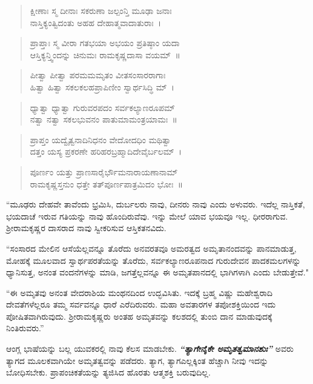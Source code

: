 \newpage

\begin{verse}
 ಕ್ಷೀಣಾಃ ಸ್ಮ ದೀನಾಃ ಸಕರುಣಾ ಜಲ್ಪಂನ್ತಿ ಮೂಢಾ ಜನಾಃ\\
 ನಾಸ್ತಿಕ್ಯಂತ್ವಿದಂತು ಅಹಹ ದೇಹಾತ್ಮವಾದಾತುರಾಃ~। 
\end{verse}

\begin{verse}
 ಪ್ರಾಪ್ತಾಃ ಸ್ಮ ವೀರಾ ಗತಭಯಾ ಅಭಯಂ ಪ್ರತಿಷ್ಠಾಂ ಯದಾ\\
 ಆಸ್ತಿಕ್ಯನ್ತ್ವಿಂದನ್ನು ಚಿನುಮಃ ರಾಮಕೃಷ್ಣದಾಸಾ ವಯಮ್~॥ 
\end{verse}

\begin{verse}
 ಪೀತ್ವಾ ಪೀತ್ವಾ ಪರಮಮಮೃತಂ ವೀತಸಂಸಾರರಾಗಾಃ\\
 ಹಿತ್ವಾ ಹಿತ್ವಾ ಸಕಲಕಲಹಪ್ರಾಪಿಣೀಂ ಸ್ವಾರ್ಥಸಿದ್ಧಿ ಮ್~। 
\end{verse}

\begin{verse}
 ಧ್ಯಾತ್ವಾ ಧ್ಯಾತ್ವಾ ಗುರುವರಪದಂ ಸರ್ವಕಲ್ಯಾಣರೂಪಮ್\\
 ನತ್ವಾ ನತ್ವಾ ಸಕಲಭುವನಂ ಪಾತುಮಾಮಂತ್ರಯಾಮಃ~॥ 
\end{verse}

\begin{verse}
 ಪ್ರಾಪ್ತಂ ಯದ್ವೈತ್ವನಾದಿನಿಧನಂ ವೇದೋದಧಿಂ ಮಥಿತ್ವಾ\\
 ದತ್ತಂ ಯಸ್ಯ ಪ್ರಕರಣೇ ಹರಿಹರಬ್ರಹ್ಮಾದಿದೇವೈರ್ಬಲಮ್~। 
\end{verse}

\begin{verse}
 ಪೂರ್ಣಂ ಯತ್ತು ಪ್ರಾಣಸಾರೈರ್ಭೌಮನಾರಾಯಣಾನಾಮ್\\
 ರಾಮಕೃಷ್ಣಸ್ತನುಂ ಧತ್ತೇ ತತ್‌ಪೂರ್ಣಪಾತ್ರಮಿದಂ ಭೋಃ~॥ 
\end{verse}

“ಮೂಢರು ದೇಹವೇ ತಾವೆಂದು ಭ್ರಮಿಸಿ, ದುರ್ಬಲರು ನಾವು, ದೀನರು ನಾವು ಎಂದು ಅಳುವರು. ಇದೆಲ್ಲ ನಾಸ್ತಿಕತೆ, ಭಯದಾಚೆ ಇರುವ ಗತಿಯನ್ನು ನಾವು ಹೊಂದಿರುವೆವು. ಇನ್ನು ಮೇಲೆ ಯಾವ ಭಯವೂ ಇಲ್ಲ. ಧೀರರಾಗುವ. ಶ‍್ರೀರಾಮಕೃಷ್ಣರ ದಾಸರಾದ ನಾವು ಸ್ವೀಕರಿಸುವ ಆಸ್ತಿಕತನವಿದು.

``ಸಂಸಾರದ ಮೇಲಿನ ಆಸೆಯೆಲ್ಲವನ್ನೂ ತೊರೆದು ಅನವರತವೂ ಅಮರತ್ವದ ಅಮೃತಾನಂದವನ್ನು ಪಾನಮಾಡುತ್ತ, ಮೋಹಕ್ಕೆ ಮೂಲವಾದ ಸ್ವಾರ್ಥಪರತೆಯನ್ನು ತೊರೆದು, ಸರ್ವಕಲ್ಯಾಣರೂಪನಾದ ಗುರುದೇವನ ಪಾದಕಮಲಗಳನ್ನು ಧ್ಯಾನಿಸುತ್ತ, ಅನಂತ ವಂದನೆಗಳನ್ನು ಮಾಡಿ, ಜಗತ್ತೆಲ್ಲವನ್ನೂ ಈ ಅಮೃತಪಾನದಲ್ಲಿ ಭಾಗಿಗಳಾಗಿ ಎಂದು ಬೇಡುತ್ತೇವೆ."

“ಈ ಅಮೃತವು ಅನಂತ ವೇದರಾಶಿಯ ಮಂಥನದಿಂದ ಉದ್ಭವಿಸಿತು. ಇದಕ್ಕೆ ಬ್ರಹ್ಮ ವಿಷ್ಣು ಮಹೇಶ್ವರಾದಿ ದೇವತೆಗಳೆಲ್ಲರೂ ತಮ್ಮ ಸರ್ವವನ್ನೂ ಧಾರೆ ಎರೆದಿರುವರು. ಮಹಾ ಅವತಾರಗಳ ತಪೋಶಕ್ತಿಯಿಂದ ಇದು ಪೋಷಿತವಾಗಿರುವುದು. ಶ‍್ರೀರಾಮಕೃಷ್ಣರು ಅಂತಹ ಅಮೃತವನ್ನು ಕಲಶದಲ್ಲಿ ತುಂಬಿ ದಾನ ಮಾಡುವುದಕ್ಕೆ ನಿಂತಿರುವರು.''

ಆಂಗ್ಲ ಭಾಷೆಯನ್ನು ಬಲ್ಲ ಯುವಕರಲ್ಲಿ ನಾವು ಕೆಲಸ ಮಾಡಬೇಕು. \textbf{\textit{ “ತ್ಯಾಗೇನೈಕೇ ಅಮೃತತ್ವಮಾನಶುಃ''}} ಅವರು ತ್ಯಾಗದ ಮೂಲಕವಾಗಿಯೇ ಅಮೃತತ್ವವನ್ನು ಪಡೆದರು. ತ್ಯಾಗ, ತ್ಯಾಗ\enginline{-}ಎಲ್ಲಕ್ಕಿಂತ ಹೆಚ್ಚಾಗಿ ನೀವು ಇದನ್ನು ಬೋಧಿಸಬೇಕು. ಪ್ರಾಪಂಚಿಕತೆಯನ್ನು ತ್ಯಜಿಸಿದ ಹೊರತು ಆತ್ಮಶಕ್ತಿ ಬರುವುದಿಲ್ಲ.

